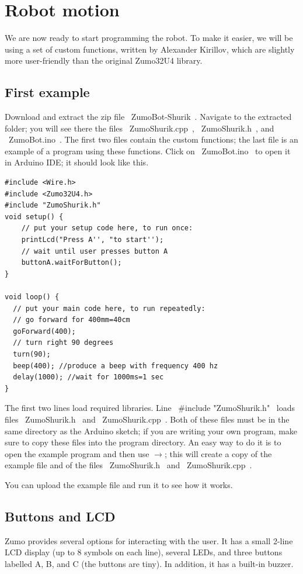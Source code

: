 \documentclass[oneside]{stml-l}
\numberwithin{figure}{chapter}
\newcommand{\menu}[1]{{\bf\sc{#1}}}
\newcommand{\smenu}[1]{$\to$\menu{#1}}
\begin{document}
\chapter{Robot motion}
We are now ready to start programming the robot. To make it easier, we 
will be using a set of custom functions, written by Alexander Kirillov, 
which are slightly more user-friendly than the original Zumo32U4 library. 

\section{First example}
Download and extract the zip file ~ZumoBot-Shurik~. Navigate to the 
extracted folder; you will see there the files ~ZumoShurik.cpp~, ~ZumoShurik.h~, 
and ~ZumoBot.ino~. The first two files contain the custom functions; 
the last file is an example of a program using these functions. 
Click on  ~ZumoBot.ino~ to open it in Arduino IDE; it should look like this. 

\begin{lstlisting}
#include <Wire.h>
#include <Zumo32U4.h>
#include "ZumoShurik.h"
void setup() {
    // put your setup code here, to run once:
    printLcd("Press A'', "to start'');
    // wait until user presses button A
    buttonA.waitForButton();
}

void loop() {
  // put your main code here, to run repeatedly: 
  // go forward for 400mm=40cm
  goForward(400);
  // turn right 90 degrees
  turn(90);
  beep(400); //produce a beep with frequency 400 hz
  delay(1000); //wait for 1000ms=1 sec
}
\end{lstlisting}

The first two lines load required libraries. Line ~#include "ZumoShurik.h"~ 
loads files ~ZumoShurik.h~ and ~ZumoShurik.cpp~. Both of these files must 
be in the same directory as the Arduino sketch; if you are writing your 
own program, make sure to copy these files into the program directory. 
An easy way to do it is to open the example program and then use 
\menu{File}\smenu{Save As}; this will create a copy of the example file 
and of the files ~ZumoShurik.h~ and ~ZumoShurik.cpp~.

You can upload the example file and run it to see how it works. 

\section{Buttons and LCD}

Zumo provides several options for interacting with the user. It has a 
small 2-line LCD display (up to 8 symbols on each line), several LEDs, and three 
buttons labelled A, B, and C (the buttons are tiny). In addition, it has a built-in buzzer.
\end{document}
